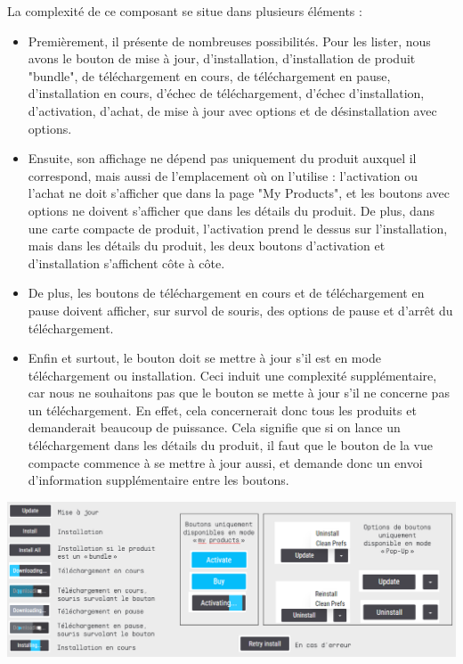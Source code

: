 \documentclass[francais]{rapportPFE}  %
\begin{document}
La complexité de ce composant se situe dans plusieurs éléments :
\begin{itemize}
    \item Premièrement, il présente de nombreuses possibilités. Pour les lister, nous avons le bouton de mise à jour, d'installation, d'installation de produit "bundle", de téléchargement en cours, de téléchargement en pause, d'installation en cours, d'échec de téléchargement, d'échec d'installation, d'activation, d'achat, de mise à jour avec options et de désinstallation avec options.
    \item Ensuite, son affichage ne dépend pas uniquement du produit auxquel il correspond, mais aussi de l'emplacement où on l'utilise : l'activation ou l'achat ne doit s'afficher que dans la page "My Products", et les boutons avec options ne doivent s'afficher que dans les détails du produit. De plus, dans une carte compacte de produit, l'activation prend le dessus sur l'installation, mais dans les détails du produit, les deux boutons d'activation et d'installation s'affichent côte à côte.
    \item De plus, les boutons de téléchargement en cours et de téléchargement en pause doivent afficher, sur survol de souris, des options de pause et d'arrêt du téléchargement.
    \item Enfin et surtout, le bouton doit se mettre à jour s'il est en mode téléchargement ou installation. Ceci induit une complexité supplémentaire, car nous ne souhaitons pas que le bouton se mette à jour s'il ne concerne pas un téléchargement. En effet, cela concernerait donc tous les produits et demanderait beaucoup de puissance. Cela signifie que si on lance un téléchargement dans les détails du produit, il faut que le bouton de la vue compacte commence à se mettre à jour aussi, et demande donc un envoi d'information supplémentaire entre les boutons.
\end{itemize}

\begin{center}
    \centering
    \includegraphics[width=1\textwidth]{graphics/boutons2.png}
    \label{fig:test1}
\end{center}
\end{document}
